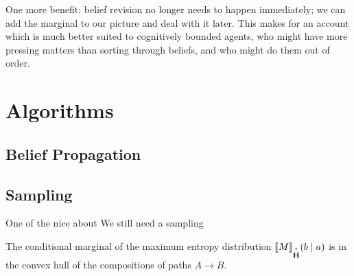 \documentclass{article}
\newcommand\MaxEnt{{\overset{\uparrow}{\mathbf H}}}
\begin{document}
	
	One more benefit: belief revision no longer needs to happen immediately; we can add the marginal to our picture and deal with it later. This makes for an account which is much better suited to cognitively bounded agents, who might have more pressing matters than sorting through beliefs, and who might do them out of order.

	\section{Algorithms}\label{sec:algorithms}
	\subsection{Belief Propagation}
	
	\subsection{Sampling}
	
	One of the nice  about 
	We still need a sampling 
	
	\begin{conj}
		The conditional marginal of the maximum entropy distribution $\bbr{M}_\MaxEnt(b \mid a)$ is in the convex hull of the compositions of paths $A \to B$. 
	\end{conj}
	
\end{document}
